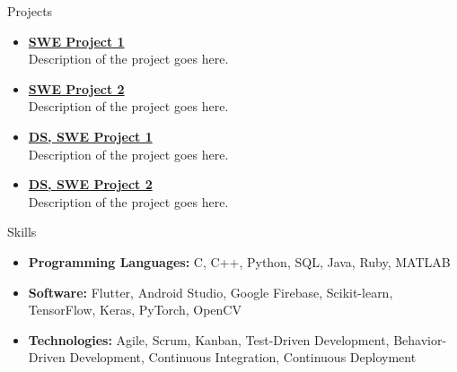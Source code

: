 \documentclass[]{mcdowellcv}
\begin{document}
\begin{cvsection}{Projects}

    \begin{cvsubsection}{}{}{}
        \begin{itemize}
            \setlength\itemsep{3pt}
            \item\textbf{\href{https://github.com/johndoe/beepboop}{SWE Project 1}} \\
            Description of the project goes here.
        \end{itemize}
    \end{cvsubsection}
    
    \begin{cvsubsection}{}{}{}
        \begin{itemize}
            \setlength\itemsep{3pt}
            \item\textbf{\href{https://github.com/johndoe/beepboop}{SWE Project 2}} \\
            Description of the project goes here.
        \end{itemize}
    \end{cvsubsection}
    
    \begin{cvsubsection}{}{}{}
        \begin{itemize}
            \setlength\itemsep{3pt}
            \item\textbf{\href{https://github.com/johndoe/beepboop}{DS, SWE Project 1}} \\
            Description of the project goes here.
        \end{itemize}
    \end{cvsubsection}
    
    \begin{cvsubsection}{}{}{}
        \begin{itemize}
            \setlength\itemsep{3pt}
            \item\textbf{\href{https://github.com/johndoe/beepboop}{DS, SWE Project 2}} \\
            Description of the project goes here.
        \end{itemize}
    \end{cvsubsection}
    
\end{cvsection}

\begin{cvsection}{Skills}
    \begin{cvsubsection}{}{}{}
        \begin{itemize}
            \item \textbf{Programming Languages:} C, C++, Python, SQL, Java, Ruby, MATLAB
            \item \textbf{Software:} Flutter, Android Studio, Google Firebase, Scikit-learn, TensorFlow, Keras, PyTorch, OpenCV
            \item \textbf{Technologies:} Agile, Scrum, Kanban, Test-Driven Development, Behavior-Driven Development, Continuous Integration, Continuous Deployment
        \end{itemize}
    \end{cvsubsection}
\end{cvsection}
\end{document}
